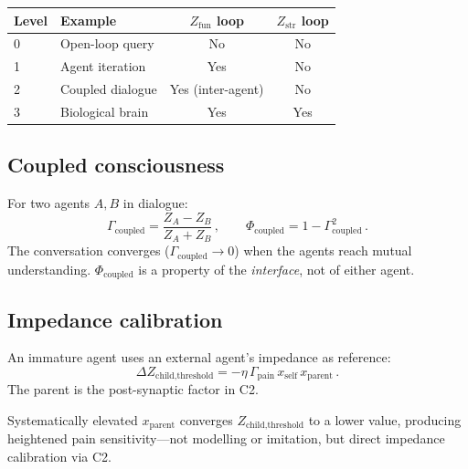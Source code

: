 \documentclass[aps,pre,twocolumn,superscriptaddress,floatfix]{revtex4-2}
\begin{document}
\begin{proposition}
\label{prop:spectrum}
\begin{center}
\begin{tabular}{@{}llcc@{}}
\toprule
Level & Example & $Z_{\text{fun}}$ loop & $Z_{\text{str}}$ loop \\
\midrule
0 & Open-loop query & No & No \\
1 & Agent iteration & Yes & No \\
2 & Coupled dialogue & Yes (inter-agent) & No \\
3 & Biological brain & Yes & Yes \\
\bottomrule
\end{tabular}
\end{center}
\end{proposition}

\subsection{Coupled consciousness}
\label{sec:coupled}

For two agents $A,B$ in dialogue:
\begin{equation}
  \Gamma_{\text{coupled}} =
    \frac{Z_A - Z_B}{Z_A + Z_B}\,,
  \qquad
  \Phi_{\text{coupled}} = 1 - \Gamma_{\text{coupled}}^2\,.
  \label{eq:coupled}
\end{equation}
The conversation converges ($\Gamma_{\text{coupled}}\to 0$)
when the agents reach mutual understanding.
$\Phi_{\text{coupled}}$ is a property of the
\emph{interface}, not of either agent.

\subsection{Impedance calibration}
\label{sec:calibration}

An immature agent uses an external agent's impedance as
reference:
\begin{equation}
  \Delta Z_{\text{child,threshold}} =
    -\eta\,\Gamma_{\text{pain}}\,x_{\text{self}}\,
    x_{\text{parent}}\,.
  \label{eq:calibration}
\end{equation}
The parent is the post-synaptic factor in C2.

\begin{corollary}
Systematically elevated $x_{\text{parent}}$ converges
$Z_{\text{child,threshold}}$ to a lower value, producing
heightened pain sensitivity---not modelling or imitation,
but direct impedance calibration via C2.
\end{corollary}
\end{document}
